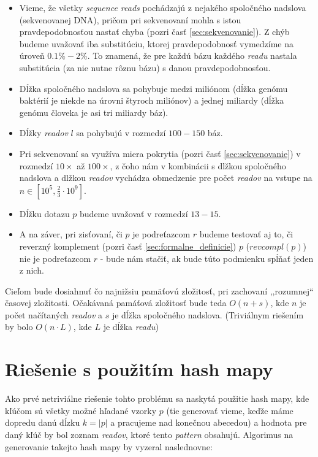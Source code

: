\begin{itemize}
    \item Vieme, že všetky \emph{sequence reads} pochádzajú z nejakého
    spoločného nadslova (sekvenovanej DNA), pričom pri sekvenovaní mohla s
    istou pravdepodobnosťou nastať chyba (pozri časť \ref{sec:sekvenovanie}). Z chýb budeme uvažovať iba substitúciu, ktorej pravdepodobnosť vymedzíme na úroveň $0.1\% - 2\% $. To znamená, že pre každú bázu každého \emph{readu} nastala substitúcia (za nie nutne rôznu bázu) s danou pravdepodobnosťou.
    \item Dĺžka spoločného nadslova sa pohybuje medzi miliónom (dĺžka
    genómu baktérií je niekde na úrovni štyroch miliónov) a jednej
    miliardy (dĺžka genómu človeka je asi tri miliardy báz).
    \item Dĺžky \emph{readov} $l$ sa pohybujú v rozmedzí $100 - 150$ báz.
    \item Pri sekvenovaní sa využíva miera pokrytia (pozri časť \ref{sec:sekvenovanie}) v rozmedzí $10\times$ až $100\times$, z čoho nám v kombinácii s dlžkou spoločného nadslova a dlžkou \emph{readov} vychádza obmedzenie pre počet \emph{readov} na vstupe na 
    $n \in [ 10^5, \frac{2}{3} \cdot 10^9 ]$.
    \item Dĺžku dotazu $p$ budeme uvažovať v rozmedzí $13 -15$. 
    \item A na záver, pri zisťovaní, či $p$ je podreťazcom $r$ budeme testovať
    aj to, či reverzný komplement (pozri časť \ref{sec:formalne_definicie}) $p$ ($revcompl(p)$) nie je podreťazcom $r$ - bude nám stačiť, ak bude túto podmienku spĺňať jeden z nich. 
\end{itemize}

Cieľom bude dosiahnuť čo najnižsiu pamäťovú zložitosť, pri zachovaní
,,rozumnej`` časovej zložitosti. Očakávaná pamáťová zložitosť bude teda $O(n +
s)$, kde $n$ je počet načítaných \emph{readov} a $s$ je dĺžka spoločného
nadslova. (Triviálnym riešením by bolo $O(n \cdot L)$, kde $L$ je dĺžka
\emph{readu})

\section{Riešenie s použitím hash mapy}
Ako prvé netriviálne riešenie tohto problému sa naskytá použitie hash mapy,
kde kľúčom sú všetky možné hľadané vzorky $p$ (tie generovať vieme,
keďže máme dopredu danú dĺzku $k = |p|$ a pracujeme nad konečnou abecedou) a
hodnota pre daný kľúč by bol zoznam \emph{readov}, ktoré tento \emph{pattern}
obsahujú. Algorimus na generovanie takejto hash mapy by vyzeral naslednovne:

